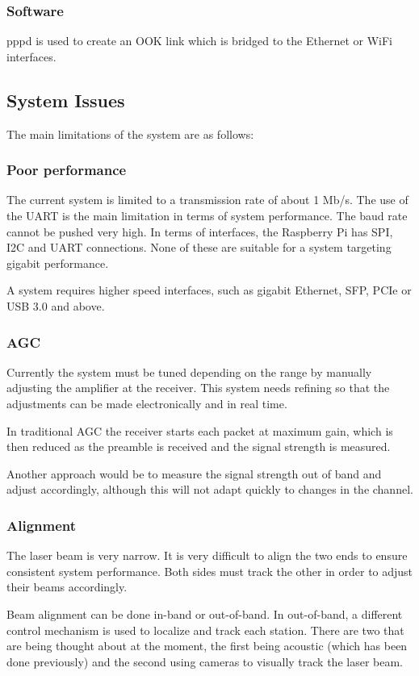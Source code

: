 \documentclass{article}
\begin{document}
\subsubsection{Software}
pppd is used to create an OOK link which is bridged to the Ethernet or WiFi interfaces.

\subsection{System Issues}
The main limitations of the system are as follows:

\subsubsection{Poor performance}
The current system is limited to a transmission rate of about 1 Mb/s. The use of the UART is the main limitation in terms of system performance. The baud rate cannot be pushed very high. In terms of interfaces, the Raspberry Pi has SPI, I2C and UART connections. None of these are suitable for a system targeting gigabit performance.

A system requires higher speed interfaces, such as gigabit Ethernet, \ac{SFP}, \ac{PCIe} or \ac{USB} 3.0 and above.

\subsubsection{\ac{AGC}}
Currently the system must be tuned depending on the range by manually adjusting the amplifier at the receiver. This system needs refining so that the adjustments can be made electronically and in real time.

In traditional \ac{AGC} the receiver starts each packet at maximum gain, which is then reduced as the preamble is received and the signal strength is measured.

Another approach would be to measure the signal strength out of band and adjust accordingly, although this will not adapt quickly to changes in the channel.

\subsubsection{Alignment}
The laser beam is very narrow. It is very difficult to align the two ends to ensure consistent system performance. Both sides must track the other in order to adjust their beams accordingly.

Beam alignment can be done in-band or out-of-band. In out-of-band, a different control mechanism is used to localize and track each station. There are two that are being thought about at the moment, the first being acoustic (which has been done previously) and the second using cameras to visually track the laser beam.
\end{document}
